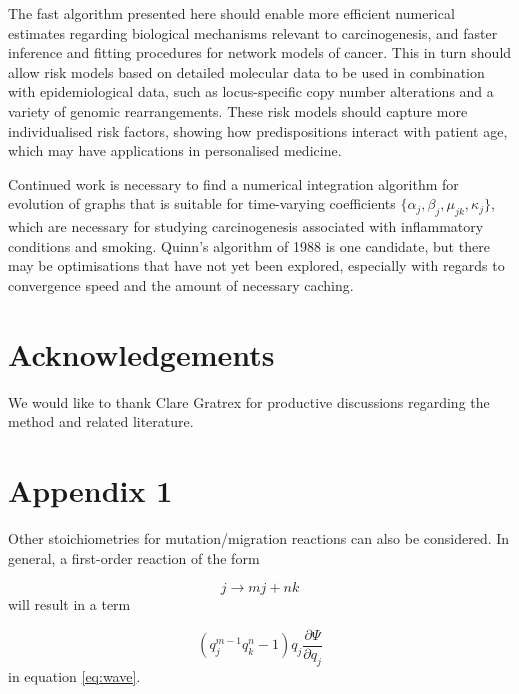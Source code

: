 \documentclass{article}
\begin{document}
The fast algorithm presented here should enable more efficient numerical
estimates regarding biological mechanisms relevant to carcinogenesis, and faster
inference and fitting procedures for network models of cancer. This in turn
should allow risk models based on detailed molecular data to be used in
combination with epidemiological data, such as locus-specific copy number
alterations and a variety of genomic rearrangements. These risk models should
capture more individualised risk factors, showing how predispositions interact
with patient age, which may have applications in personalised medicine.

Continued work is necessary to find a numerical integration algorithm for
evolution of graphs that is suitable for time-varying coefficients $\{\alpha_j,
\beta_j, \mu_{jk}, \kappa_j\}$, which are necessary for studying carcinogenesis
associated with inflammatory conditions and smoking. Quinn's algorithm of 1988
is one candidate, but there may be optimisations that have not yet been
explored, especially with regards to convergence speed and the amount of
necessary caching.

\section{Acknowledgements}

We would like to thank Clare Gratrex for productive discussions regarding the
method and related literature.





\section{Appendix 1}

Other stoichiometries for mutation/migration reactions can also be considered.
In general, a first-order reaction of the form

\begin{equation}
    j \rightarrow m j + n k
\end{equation}
will result in a term

\begin{equation}
    (q_j^{m-1} q_k^n - 1) q_j \frac{\partial \Psi}{\partial q_j}
\end{equation}
in equation \eqref{eq:wave}.
\end{document}
